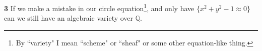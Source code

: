 \documentclass[12pt]{article}
\begin{document}
\noindent \textbf{3} If we make a mistake in our circle equation\footnote{By ``variety" I mean ``scheme" or ``sheaf" or some other equation-like thing.}, and only have $\{x^2 + y^2 -1 \approx 0\}$ can we still have an algebraic variety over $\mathbb{Q}$. \\
\end{document}
